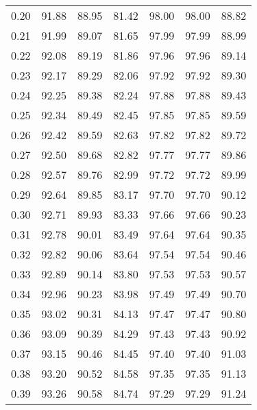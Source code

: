 \begin{tabular}{|c|c|c|c|c|c|c|}
      0.20 &     91.88 &     88.95 &      81.42 &   98.00 &      98.00 &         88.82 \\
      0.21 &     91.99 &     89.07 &      81.65 &   97.99 &      97.99 &         88.99 \\
      0.22 &     92.08 &     89.19 &      81.86 &   97.96 &      97.96 &         89.14 \\
      0.23 &     92.17 &     89.29 &      82.06 &   97.92 &      97.92 &         89.30 \\
      0.24 &     92.25 &     89.38 &      82.24 &   97.88 &      97.88 &         89.43 \\
      0.25 &     92.34 &     89.49 &      82.45 &   97.85 &      97.85 &         89.59 \\
      0.26 &     92.42 &     89.59 &      82.63 &   97.82 &      97.82 &         89.72 \\
      0.27 &     92.50 &     89.68 &      82.82 &   97.77 &      97.77 &         89.86 \\
      0.28 &     92.57 &     89.76 &      82.99 &   97.72 &      97.72 &         89.99 \\
      0.29 &     92.64 &     89.85 &      83.17 &   97.70 &      97.70 &         90.12 \\
      0.30 &     92.71 &     89.93 &      83.33 &   97.66 &      97.66 &         90.23 \\
      0.31 &     92.78 &     90.01 &      83.49 &   97.64 &      97.64 &         90.35 \\
      0.32 &     92.82 &     90.06 &      83.64 &   97.54 &      97.54 &         90.46 \\
      0.33 &     92.89 &     90.14 &      83.80 &   97.53 &      97.53 &         90.57 \\
      0.34 &     92.96 &     90.23 &      83.98 &   97.49 &      97.49 &         90.70 \\
      0.35 &     93.02 &     90.31 &      84.13 &   97.47 &      97.47 &         90.80 \\
      0.36 &     93.09 &     90.39 &      84.29 &   97.43 &      97.43 &         90.92 \\
      0.37 &     93.15 &     90.46 &      84.45 &   97.40 &      97.40 &         91.03 \\
      0.38 &     93.20 &     90.52 &      84.58 &   97.35 &      97.35 &         91.13 \\
      0.39 &     93.26 &     90.58 &      84.74 &   97.29 &      97.29 &         91.24 \\

\end{tabular}
